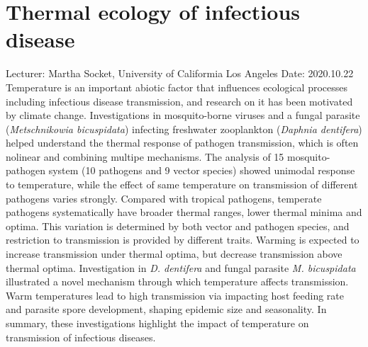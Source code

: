 \documentclass[11pt]{article}
\begin{document}
  \section{Thermal ecology of infectious disease}
  Lecturer: Martha Socket, University of Califormia Los Angeles
  \newline
  Date: 2020.10.22
  \newline
  Temperature is an important abiotic factor that influences ecological processes including infectious disease transmission, and research on it has been motivated by climate change. 
  Investigations in mosquito-borne viruses and a fungal parasite (\textit{Metschnikowia bicuspidata}) infecting freshwater zooplankton (\textit{Daphnia dentifera}) helped understand the thermal response of pathogen transmission, which is often nolinear and combining multipe mechanisms. 
  \newline 
  The analysis of 15 mosquito-pathogen system (10 pathogens and 9 vector species) showed unimodal response to temperature, while the effect of same temperature on transmission of different pathogens varies strongly. 
  Compared with tropical pathogens, temperate pathogens systematically have broader thermal ranges, lower thermal minima and optima. 
  This variation is determined by both vector and pathogen species, and restriction to transmission is provided by different traits.  
  Warming is expected to increase transmission under thermal optima, but decrease transmission above thermal optima. 
  \newline
  Investigation in \textit{D. dentifera} and fungal parasite \textit{M. bicuspidata} illustrated a novel mechanism through which temperature affects transmission. 
  Warm temperatures lead to high transmission via impacting host feeding rate and parasite spore development, shaping epidemic size and seasonality.
  \newline
  In summary, these investigations highlight the impact of temperature on transmission of infectious diseases.

  \newpage
\end{document}
